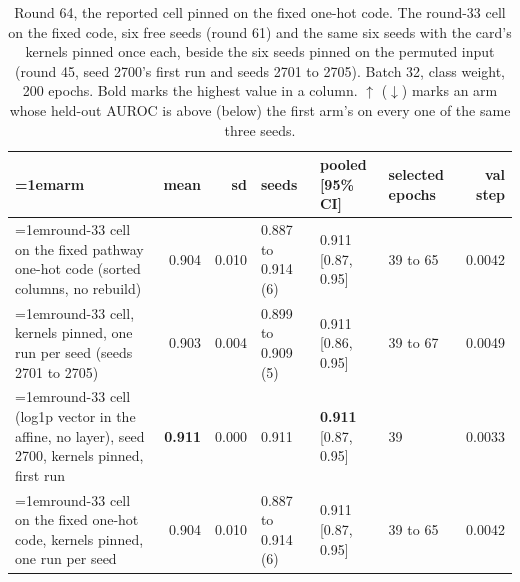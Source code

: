 \begin{table}[H]
  \centering
  \scriptsize
  \setlength{\tabcolsep}{2.5pt}
  \caption[Round 64, the reported cell pinned on the fixed one-hot code]{Round 64, the reported cell pinned on the fixed one-hot code. The round-33 cell on the fixed code, six free seeds (round 61) and the same six seeds with the card's kernels pinned once each, beside the six seeds pinned on the permuted input (round 45, seed 2700's first run and seeds 2701 to 2705). Batch 32, class weight, 200 epochs. Bold marks the highest value in a column. $\uparrow$ ($\downarrow$) marks an arm whose held-out AUROC is above (below) the first arm's on every one of the same three seeds.}
  \label{tab:w80}
  \begin{tabular}{@{}>{\raggedright\hangindent=1em\hangafter=1\arraybackslash}p{84.4mm}rrlllr@{}}
    \hline
    arm & mean & sd & seeds & pooled [95\% CI] & selected epochs & val step \\
    \hline
    round-33 cell on the fixed pathway one-hot code (sorted columns, no rebuild) & 0.904 & 0.010 & 0.887 to 0.914 (6) & 0.911 [0.87, 0.95] & 39 to 65 & 0.0042 \\
    round-33 cell, kernels pinned, one run per seed (seeds 2701 to 2705) & 0.903 & 0.004 & 0.899 to 0.909 (5) & 0.911 [0.86, 0.95] & 39 to 67 & 0.0049 \\
    round-33 cell (log1p vector in the affine, no layer), seed 2700, kernels pinned, first run & \textbf{0.911} & 0.000 & 0.911 & \textbf{0.911} [0.87, 0.95] & 39 & 0.0033 \\
    round-33 cell on the fixed one-hot code, kernels pinned, one run per seed & 0.904 & 0.010 & 0.887 to 0.914 (6) & 0.911 [0.87, 0.95] & 39 to 65 & 0.0042 \\
    \hline
  \end{tabular}
\end{table}
